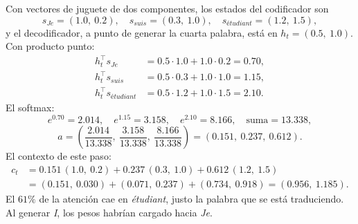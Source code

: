 \documentclass[11pt,letterpaper]{article}
\begin{document}
\begin{center}
\end{center}

\begin{ejemplo}
    Con vectores de juguete de dos componentes, los estados del
    codificador son
    \[
        s_{\textit{Je}} = (1.0,\ 0.2) , \quad
        s_{\textit{suis}} = (0.3,\ 1.0) , \quad
        s_{\textit{étudiant}} = (1.2,\ 1.5) ,
    \]
    y el decodificador, a punto de generar la cuarta palabra, está en
    $h_t = (0.5,\ 1.0)$. Con producto punto:
    \begin{align*}
        h_t^{\top} s_{\textit{Je}} &= 0.5 \cdot 1.0 + 1.0 \cdot 0.2
            = 0.70 , \\
        h_t^{\top} s_{\textit{suis}} &= 0.5 \cdot 0.3 + 1.0 \cdot 1.0
            = 1.15 , \\
        h_t^{\top} s_{\textit{étudiant}} &= 0.5 \cdot 1.2
            + 1.0 \cdot 1.5 = 2.10 .
    \end{align*}
    El softmax:
    \[
        e^{0.70} = 2.014 , \quad e^{1.15} = 3.158 , \quad
        e^{2.10} = 8.166 , \quad \text{suma} = 13.338 ,
    \]
    \[
        a = \left(\frac{2.014}{13.338},\ \frac{3.158}{13.338},\
            \frac{8.166}{13.338}\right) = (0.151,\ 0.237,\ 0.612) .
    \]
    El contexto de este paso:
    \begin{align*}
        c_t &= 0.151\,(1.0,\ 0.2) + 0.237\,(0.3,\ 1.0)
               + 0.612\,(1.2,\ 1.5) \\
            &= (0.151,\ 0.030) + (0.071,\ 0.237) + (0.734,\ 0.918)
             = (0.956,\ 1.185) .
    \end{align*}
    El $61\%$ de la atención cae en \textit{étudiant}, justo la
    palabra que se está traduciendo. Al generar \textit{I}, los pesos
    habrían cargado hacia \textit{Je}.
\end{ejemplo}
\end{document}
